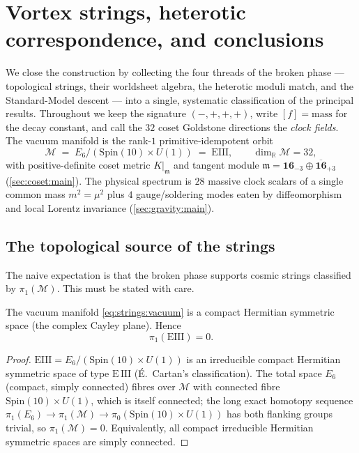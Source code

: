\section{Vortex strings, heterotic correspondence, and conclusions}
\label{sec:strings:main}

We close the construction by collecting the four threads of the broken
phase --- topological strings, their worldsheet algebra, the heterotic
moduli match, and the Standard-Model descent --- into a single,
systematic classification of the principal results. Throughout we
keep the signature $(-,+,+,+)$, write $[f]=\text{mass}$ for the decay
constant, and call the $32$ coset Goldstone directions the \emph{clock
fields}. The vacuum manifold is the rank-$1$ primitive-idempotent orbit
\begin{equation}
  \mathcal{M} \;=\; E_{6}/(\mathrm{Spin}(10)\times U(1)) \;=\; \mathrm{EIII},
  \qquad \dim_{\mathbb{R}}\mathcal{M}=32,
  \label{eq:strings:vacuum}
\end{equation}
with positive-definite coset metric $K|_{\mathfrak m}$ and tangent module
$\mathfrak m = \mathbf{16}_{-3}\oplus\overline{\mathbf{16}}_{+3}$
(\autoref{sec:coset:main}). The physical spectrum is $28$ massive clock
scalars of a single common mass $m^{2}=\mu^{2}$ plus $4$ gauge/soldering
modes eaten by diffeomorphism and local Lorentz invariance
(\autoref{sec:gravity:main}).

\subsection{The topological source of the strings}
\label{sec:strings:topology}

The naive expectation is that the broken phase supports cosmic strings
classified by $\pi_{1}(\mathcal{M})$. This must be stated with care.

\begin{theorem}
\label{thm:strings:pi1}
The vacuum manifold \eqref{eq:strings:vacuum} is a compact Hermitian
symmetric space (the complex Cayley plane). Hence
\[
   \pi_{1}(\mathrm{EIII})=0 .
\]
\end{theorem}

\begin{proof}
$\mathrm{EIII}=E_{6}/(\mathrm{Spin}(10)\times U(1))$ is an irreducible
compact Hermitian symmetric space of type $\mathrm{E\,III}$
(\'E.~Cartan's classification). The total space $E_{6}$ (compact, simply
connected) fibres over $\mathcal{M}$ with connected fibre
$\mathrm{Spin}(10)\times U(1)$, which is itself connected; the long exact
homotopy sequence
$\pi_{1}(E_{6})\to\pi_{1}(\mathcal{M})\to\pi_{0}(\mathrm{Spin}(10)\times
U(1))$ has both flanking groups trivial, so $\pi_{1}(\mathcal{M})=0$.
Equivalently, all compact irreducible Hermitian symmetric spaces are
simply connected.
\end{proof}

